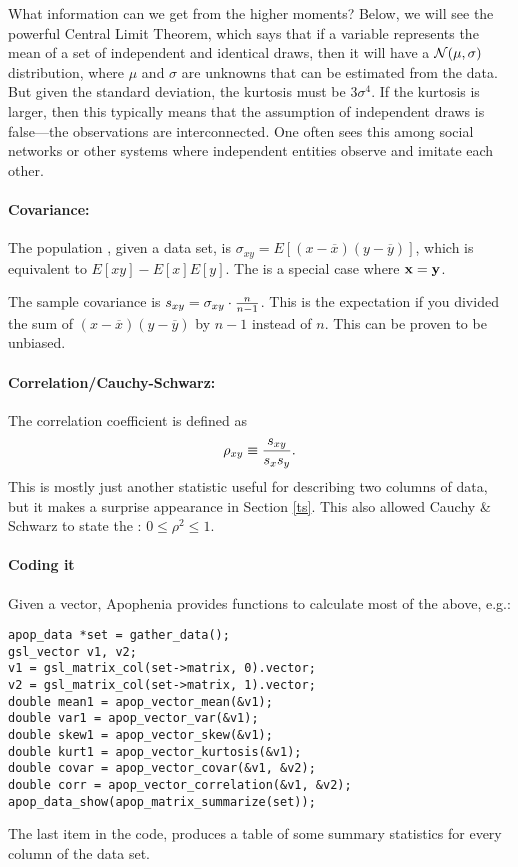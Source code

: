 What information can we get from the higher moments?  Below, we will
see the powerful Central Limit Theorem, which says that if a variable
represents the mean of a set of independent and identical draws, then it
will have a ${\cal N}(\mu,\sigma)$ distribution, where $\mu$ and $\sigma$
are unknowns that can be estimated from the data. But given the standard
deviation, the kurtosis must be $3\sigma^4$. If the kurtosis is larger,
then this typically means that the assumption of independent draws is
false---the observations are interconnected.\label{kurt1} One often sees
this among social networks or other systems where independent entities
observe and imitate each other.

\paragraph{Covariance:} The population , given a data set,
is $\sigma_{xy} = E[(x-\overline x)(y-\overline y)]$, which is equivalent
to $E[xy]-E[x]E[y]$. The  is a special case where ${\bf x}={\bf y}$.

The sample covariance is $s_{xy}=\sigma_{xy}\cdot {n\over n-1}$. This
is
the expectation if you  divided the sum of $(x-\overline
x)(y-\overline y)$ by $n-1$ instead of $n$. This
can be proven to be unbiased.

\paragraph{Correlation/Cauchy-Schwarz:} The correlation coefficient is
defined as $$\rho_{xy}\equiv{s_{xy}\over s_x s_y}.$$ This is mostly just another
statistic useful for describing two columns of data,
but it makes a surprise appearance in Section \ref{ts}. This
also allowed Cauchy \& Schwarz to state the : $0\leq \rho^2 \leq 1$.  \label{correlation}

\paragraph{Coding it} Given a vector, Apophenia provides functions to
calculate most of the above, e.g.:

 
 
\begin{lstlisting}
apop_data *set = gather_data();
gsl_vector v1, v2;
v1 = gsl_matrix_col(set->matrix, 0).vector;
v2 = gsl_matrix_col(set->matrix, 1).vector;
double mean1 = apop_vector_mean(&v1);
double var1 = apop_vector_var(&v1);
double skew1 = apop_vector_skew(&v1);
double kurt1 = apop_vector_kurtosis(&v1);
double covar = apop_vector_covar(&v1, &v2);
double corr = apop_vector_correlation(&v1, &v2);
apop_data_show(apop_matrix_summarize(set));
\end{lstlisting}
The last item in the code,  produces a table of
some summary statistics for every column of the data set.

